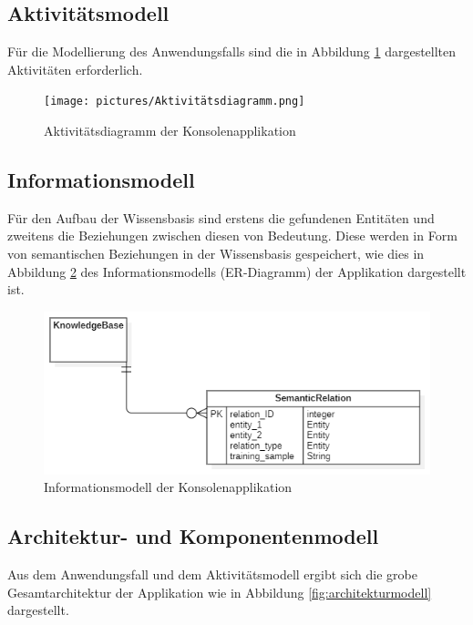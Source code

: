 \subsection{Aktivitätsmodell}

Für die Modellierung des Anwendungsfalls sind die in Abbildung \ref{fig:Aktivitätsmodell} dargestellten Aktivitäten erforderlich.

\begin{figure}[]
    \centering
    \texttt{[image: pictures/Aktivitätsdiagramm.png]}
    \caption{Aktivitätsdiagramm der Konsolenapplikation}
    \label{fig:Aktivitätsmodell}
\end{figure}

\subsection{Informationsmodell}

Für den Aufbau der Wissensbasis sind erstens die gefundenen Entitäten und zweitens die Beziehungen zwischen diesen von Bedeutung. Diese werden in Form von semantischen Beziehungen in der Wissensbasis gespeichert, wie dies in  Abbildung \ref{fig:informationsmodell} des Informationsmodells (ER-Diagramm) der Applikation dargestellt ist.

\begin{figure}[h]
    \centering
    \includegraphics[width=\textwidth]{pictures/Informationsmodell.png}
    \caption{Informationsmodell der Konsolenapplikation}
    \label{fig:informationsmodell}
\end{figure}

\subsection{Architektur- und Komponentenmodell}

Aus dem Anwendungsfall und dem Aktivitätsmodell ergibt sich die grobe Gesamtarchitektur der Applikation wie in Abbildung \ref{fig:architekturmodell} dargestellt.

